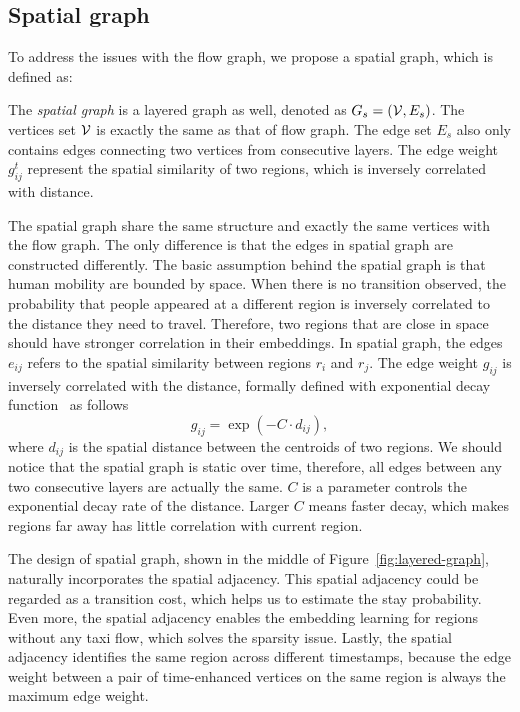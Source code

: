 \subsection{Spatial graph}



To address the issues with the flow graph, we propose a spatial graph, which is defined as:
\begin{definition}
\label{def:g_s}
The \emph{spatial graph} is a layered graph as well, denoted as $G_s = (\mathcal{V}, E_s)$. The  vertices set $\mathcal{V}$ is exactly the same as that of flow graph. The edge set $E_s$ also only contains edges connecting two vertices from consecutive layers. The edge weight $g_{ij}^t$ represent the spatial similarity of two regions, which is inversely correlated with distance.
\end{definition}

The spatial graph share the same structure and exactly the same vertices with the flow graph. The only difference is that the edges in spatial graph are constructed differently. The basic assumption behind the spatial graph is that human mobility are bounded by space. When there is no transition observed, the probability that people appeared at a different region is inversely correlated to the distance they need to travel. Therefore, two regions that are close in space should have stronger correlation in their embeddings. In spatial graph, the edges $e_{ij}$ refers to the spatial similarity between regions $r_i$ and $r_j$. The edge weight $g_{ij}$ is inversely correlated with the distance, formally defined with exponential decay function~\cite{nekola1999distance} as follows
\begin{equation}
g_{ij} = \exp ( - C \cdot d_{ij} ),
\end{equation}
where $d_{ij}$ is the spatial distance between the centroids of two regions. We should notice that the spatial graph is static over time, therefore, all edges between any two consecutive layers are actually the same. $C$ is a parameter controls the exponential decay rate of the distance. Larger $C$ means faster decay, which makes regions far away has little correlation with current region.





The design of spatial graph, shown in the middle of Figure~\ref{fig:layered-graph}, naturally incorporates the spatial adjacency. This spatial adjacency could be regarded as a transition cost, which helps us to estimate the stay probability. Even more, the spatial adjacency enables the embedding learning for regions without any taxi flow, which solves the sparsity issue. Lastly, the spatial adjacency identifies the same region across different timestamps, because the edge weight between a pair of time-enhanced vertices on the same region is always the maximum edge weight. 




